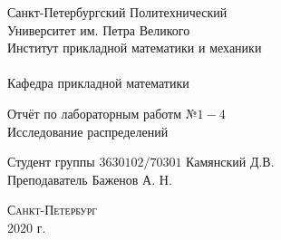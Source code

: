 \documentclass[a4]{article}
\begin{document}
\def\contentsname{\LARGE{Содержание}}
\thispagestyle{empty}
\begin{center} 
\vspace{2cm} 
{\Large \sc Санкт-Петербургский Политехнический}\\
\vspace{2mm}
{\Large \sc Университет} им. {\Large\sc Петра Великого}\\
\vspace{1cm}
{\large \sc Институт прикладной математики и механики\\ 
\vspace{0.5mm}
\textsc{}}\\ 
\vspace{0.5mm}
{\large\sc Кафедра прикладной математики}\\
\vspace{15mm}
{\huge \sc Отчёт по лабораторным работм №$1-4$\\
	Исследование распределений
	\vspace{6mm}
	
}
\vspace*{2mm}
\vspace{6cm} 
Студент группы $3630102/70301$ \hfill Камянский Д.В.\\
\vspace{1cm}
Преподаватель \hfill Баженов А. Н.\\
\vspace{20mm} 


\vfill {\large\textsc{Санкт-Петербург}}\\ 
2020 г.
\end{center}


\newpage
\pagestyle{plain}

\end{document}
